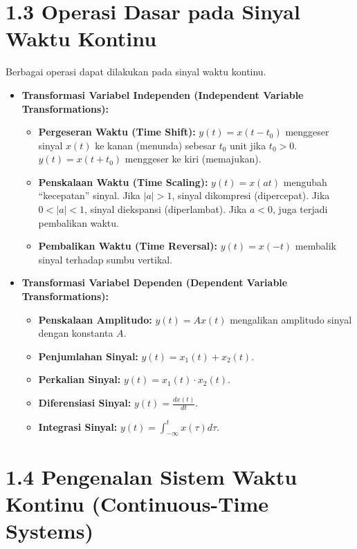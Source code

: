 \documentclass[
  letterpaper,
  DIV=11,
  numbers=noendperiod]{scrreprt}
\providecommand{\tightlist}{%
  \setlength{\itemsep}{0pt}\setlength{\parskip}{0pt}}\usepackage{longtable,booktabs,array}
\begin{document}
\section{1.3 Operasi Dasar pada Sinyal Waktu
Kontinu}\label{operasi-dasar-pada-sinyal-waktu-kontinu}

Berbagai operasi dapat dilakukan pada sinyal waktu kontinu.

\begin{itemize}
\item
  \textbf{Transformasi Variabel Independen (Independent Variable
  Transformations):}

  \begin{itemize}
  \tightlist
  \item
    \textbf{Pergeseran Waktu (Time Shift):} \(y(t) = x(t-t_0)\)
    menggeser sinyal \(x(t)\) ke kanan (menunda) sebesar \(t_0\) unit
    jika \(t_0 > 0\). \(y(t) = x(t+t_0)\) menggeser ke kiri (memajukan).
  \item
    \textbf{Penskalaan Waktu (Time Scaling):} \(y(t) = x(at)\) mengubah
    ``kecepatan'' sinyal. Jika \(|a|>1\), sinyal dikompresi
    (dipercepat). Jika \(0 < |a| < 1\), sinyal diekspansi (diperlambat).
    Jika \(a < 0\), juga terjadi pembalikan waktu.
  \item
    \textbf{Pembalikan Waktu (Time Reversal):} \(y(t) = x(-t)\) membalik
    sinyal terhadap sumbu vertikal.
  \end{itemize}
\item
  \textbf{Transformasi Variabel Dependen (Dependent Variable
  Transformations):}

  \begin{itemize}
  \tightlist
  \item
    \textbf{Penskalaan Amplitudo:} \(y(t) = A x(t)\) mengalikan
    amplitudo sinyal dengan konstanta \(A\).
  \item
    \textbf{Penjumlahan Sinyal:} \(y(t) = x_1(t) + x_2(t)\).
  \item
    \textbf{Perkalian Sinyal:} \(y(t) = x_1(t) \cdot x_2(t)\).
  \item
    \textbf{Diferensiasi Sinyal:} \(y(t) = \frac{dx(t)}{dt}\).
  \item
    \textbf{Integrasi Sinyal:}
    \(y(t) = \int_{-\infty}^{t} x(\tau) d\tau\).
  \end{itemize}
\end{itemize}

\section{1.4 Pengenalan Sistem Waktu Kontinu (Continuous-Time
Systems)}\label{pengenalan-sistem-waktu-kontinu-continuous-time-systems}
\end{document}
